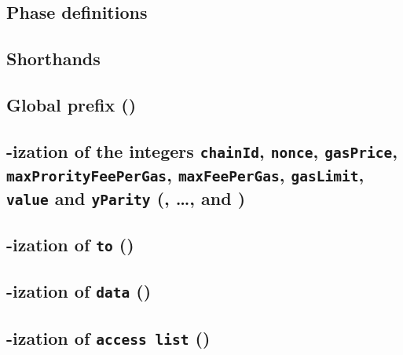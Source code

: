 \def\localSectionTitle {\rlp{}-ization of the integers \texttt{chainId}, \texttt{nonce}, \texttt{gasPrice}, \texttt{maxProrityFeePerGas}, \texttt{maxFeePerGas}, \texttt{gasLimit}, \texttt{value} and \texttt{yParity} }

\subsection{Phase definitions}                                                                    \label{rlp txn v2: phase constraints: definitions}    
\subsection{Shorthands}                                                                           \label{rlp txn v2: phase constraints: shorthands}     
\subsection{Global \rlp{} prefix (\phaseRlpPrefix)}                                               \label{rlp txn v2: phase constraints: rlp prefix}     
\subsection{\localSectionTitle{} (\phaseChainId{}, \dots, \phaseValue{} and \phaseY{})}    \label{rlp txn v2: phase constraints: integers}       
\subsection{\rlp{}-ization of \texttt{to} (\phaseTo)}                                             \label{rlp txn v2: phase constraints: to address}         
\subsection{\rlp{}-ization of \texttt{data} (\phaseData)}                                         \label{rlp txn v2: phase constraints: payload}        
\subsection{\rlp{}-ization of \texttt{access list} (\phaseAccessList)}                            \label{rlp txn v2: phase constraints: access list}    
